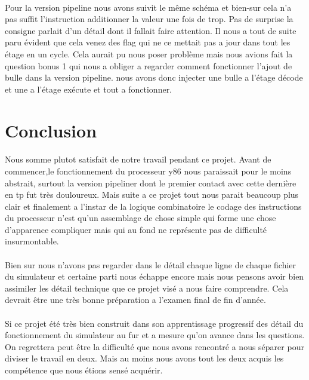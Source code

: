 \documentclass[12pt]{article}
\begin{document}
\paragraph{}Pour la version pipeline nous avons suivit le même schéma et bien-sur cela n'a pas suffit l'instruction additionner la valeur une fois de trop. Pas de surprise la consigne parlait d'un détail dont il fallait faire attention. Il nous a tout de suite paru évident que cela venez des flag qui ne ce mettait pas a jour dans tout les étage en un cycle. Cela aurait pu nous poser problème mais nous avions fait la question bonus 1 qui nous a obliger a regarder comment fonctionner l'ajout de bulle dans la version pipeline. nous avons donc injecter une bulle a l'étage décode et une a l'étage exécute et tout a fonctionner.



\section{Conclusion}

\paragraph{} Nous somme plutot satisfait de notre travail pendant ce projet. Avant de commencer,le fonctionnement du processeur y86 nous paraissait pour le moins abstrait, surtout la version pipeliner dont le premier contact avec cette dernière en tp fut très douloureux. Mais suite a ce projet tout nous parait beaucoup plus clair et finalement a l'instar de la logique combinatoire le codage des instructions du processeur n'est qu'un assemblage de chose simple qui forme une chose d'apparence compliquer mais qui au fond ne représente pas de difficulté insurmontable.

\paragraph{} Bien sur nous n'avons pas regarder dans le détail chaque ligne de chaque fichier du simulateur et certaine parti nous échappe encore mais nous pensons avoir bien assimiler les détail technique que ce projet visé a nous faire comprendre. Cela devrait être une très bonne préparation a l’examen final de fin d'année.

\paragraph{} Si ce projet été très bien construit dans son apprentissage progressif des détail du fonctionnement du simulateur au fur et a mesure qu'on avance dans les questions. On regrettera peut être la difficulté que nous avons rencontré a nous séparer pour diviser le travail en deux. Mais au moins nous avons tout les deux acquis les compétence que nous étions sensé acquérir.
\end{document}
